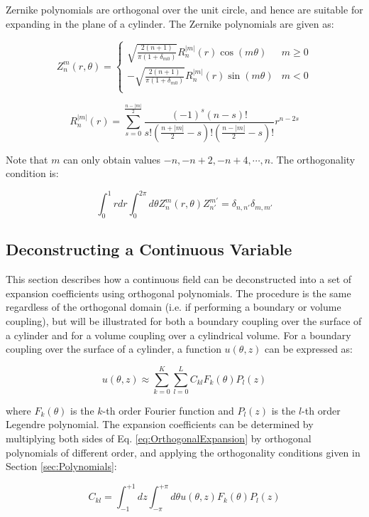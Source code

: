 \documentclass[10pt]{article}
\newcommand{\beq}{\begin{equation}}
\newcommand{\eeq}{\end{equation}}
\numberwithin{equation}{section} %
\begin{document}
Zernike polynomials are orthogonal over the unit circle, and hence are suitable for expanding in the plane of a cylinder. The Zernike polynomials are given as:

\beq
\label{eq:ZernikeScaled}
Z_n^m(r,\theta)=
\begin{cases}
\sqrt{\frac{2(n+1)}{\pi\left(1+\delta_{m0}\right)}}R_n^{|m|}(r)\cos{(m\theta)} & m\geq 0\\
-\sqrt{\frac{2(n+1)}{\pi\left(1+\delta_{m0}\right)}}R_n^{|m|}(r)\sin{(m\theta)} & m < 0\\
\end{cases}
\eeq

\beq
R_n^{|m|}(r)=\sum_{s=0}^{\frac{n-|m|}{2}}\frac{(-1)^s(n-s)!}{s!\left(\frac{n+|m|}{2}-s\right)!\left(\frac{n-|m|}{2}-s\right)!}r^{n-2s}
\eeq

Note that \(m\) can only obtain values \(-n, -n+2, -n+4, \cdots, n\). The orthogonality condition is:

\beq
\label{eq:ZernikeOrthogonal}
\int_{0}^{1}rdr\int_{0}^{2\pi}d\theta Z_{n}^m(r,\theta)Z_{n'}^{m'}=\delta_{n,n'}\delta_{m,m'}
\eeq

\subsection{Deconstructing a Continuous Variable}
This section describes how a continuous field can be deconstructed into a set of expansion coefficients using orthogonal polynomials. The procedure is the same regardless of the orthogonal domain (i.e. if performing a boundary or volume coupling), but will be illustrated for both a boundary coupling over the surface of a cylinder and for a volume coupling over a cylindrical volume. For a boundary coupling over the surface of a cylinder, a function \(u(\theta,z)\) can be expressed as:

\beq
\label{eq:OrthogonalExpansion}
u(\theta, z)\approx\sum_{k=0}^K\sum_{l=0}^LC_{kl}F_k(\theta)P_l(z)
\eeq

where \(F_k(\theta)\) is the \(k\)-th order Fourier function and \(P_l(z)\) is the \(l\)-th order Legendre polynomial. The expansion coefficients can be determined by multiplying both sides of Eq. \eqref{eq:OrthogonalExpansion} by orthogonal polynomials of different order, and applying the orthogonality conditions given in Section \ref{sec:Polynomials}:

\beq
\label{eq:ScaledExpansionCoeff}
C_{kl}=\int_{-1}^{+1}dz\int_{-\pi}^{+\pi}d\theta u(\theta, z)F_k(\theta)P_l(z)
\eeq
\end{document}
